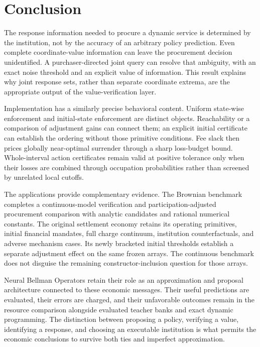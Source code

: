 \section{Conclusion}
The response information needed to procure a dynamic service is determined by the institution, not by the accuracy of an arbitrary policy prediction. Even complete coordinate-value information can leave the procurement decision unidentified. A purchaser-directed joint query can resolve that ambiguity, with an exact noise threshold and an explicit value of information. This result explains why joint response sets, rather than separate coordinate extrema, are the appropriate output of the value-verification layer.

Implementation has a similarly precise behavioral content. Uniform state-wise enforcement and initial-state enforcement are distinct objects. Reachability or a comparison of adjustment gains can connect them; an explicit initial certificate can establish the ordering without those primitive conditions. Fee slack then prices globally near-optimal surrender through a sharp loss-budget bound. Whole-interval action certificates remain valid at positive tolerance only when their losses are combined through occupation probabilities rather than screened by unrelated local cutoffs.

The applications provide complementary evidence. The Brownian benchmark completes a continuous-model verification and participation-adjusted procurement comparison with analytic candidates and rational numerical constants. The original settlement economy retains its operating primitives, initial financial mandates, full charge continuum, institution counterfactuals, and adverse mechanism cases. Its newly bracketed initial thresholds establish a separate adjustment effect on the same frozen arrays. The continuous benchmark does not disguise the remaining constructor-inclusion question for those arrays.

Neural Bellman Operators retain their role as an approximation and proposal architecture connected to these economic messages. Their useful predictions are evaluated, their errors are charged, and their unfavorable outcomes remain in the resource comparison alongside evaluated teacher banks and exact dynamic programming. The distinction between proposing a policy, verifying a value, identifying a response, and choosing an executable institution is what permits the economic conclusions to survive both ties and imperfect approximation.
